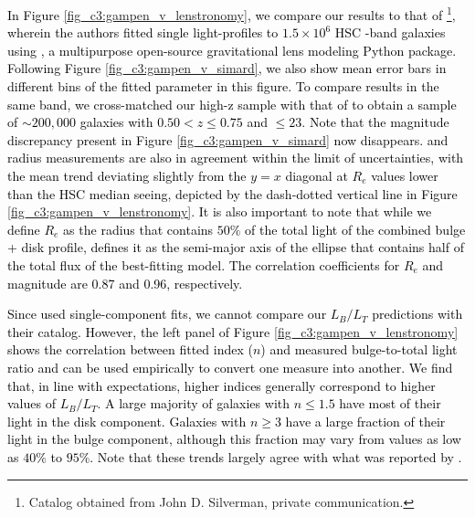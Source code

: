 \textcolor{black}{In Figure \ref{fig_c3:gampen_v_lenstronomy}, we compare our results to that of \citet{hsc_sersic}\footnote{Catalog obtained from John D. Silverman, private communication.}, wherein the authors fitted single \sersic{} light-profiles to $1.5\times10^6$ HSC \ib{}-band galaxies using \lenstronomy{} \citep{Birrer2018Lenstronomy:Package}, a multipurpose open-source gravitational lens modeling Python package. Following Figure \ref{fig_c3:gampen_v_simard}, we also show mean error bars in different bins of the fitted parameter in this figure. To compare results in the same band, we cross-matched our high-z sample with that of \citet{hsc_sersic} to obtain a sample of $\sim200,000$ galaxies with $0.50 < z \leq 0.75$ and \ib{} $\leq23$. Note that the magnitude discrepancy present in Figure \ref{fig_c3:gampen_v_simard} now disappears. \gampen{} and \lenstronomy{} radius measurements are also in agreement within the limit of uncertainties, with the mean trend deviating slightly from the $y=x$ diagonal at $R_e$ values lower than the HSC median seeing, depicted by the dash-dotted vertical line in Figure \ref{fig_c3:gampen_v_lenstronomy}. It is also important to note that while we define $R_e$ as the radius that contains $50\%$ of the total light of the combined bulge + disk profile, \citet{hsc_sersic} defines it as the semi-major axis of the ellipse that contains half of the total flux of the best-fitting \sersic{} model. The correlation coefficients for $R_e$ and magnitude are 0.87 and 0.96, respectively.} 

\textcolor{black}{Since \citet{hsc_sersic} used single-component fits, we cannot compare our $L_B/L_T$ predictions with their catalog. However, the left panel of Figure \ref{fig_c3:gampen_v_lenstronomy} shows the correlation between fitted \sersic{} index ($n$) and measured bulge-to-total light ratio and can be used empirically to convert one measure into another. We find that, in line with expectations, higher \sersic{} indices generally correspond to higher values of $L_B/L_T$. A large majority of galaxies with $n \leq 1.5$ have most of their light in the disk component. Galaxies with $ n \geq 3$ have a large fraction of their light in the bulge component, although this fraction may vary from values as low as $40\%$ to $95\%$. Note that these trends largely agree with what was reported by \citet{simmons_08}.}


